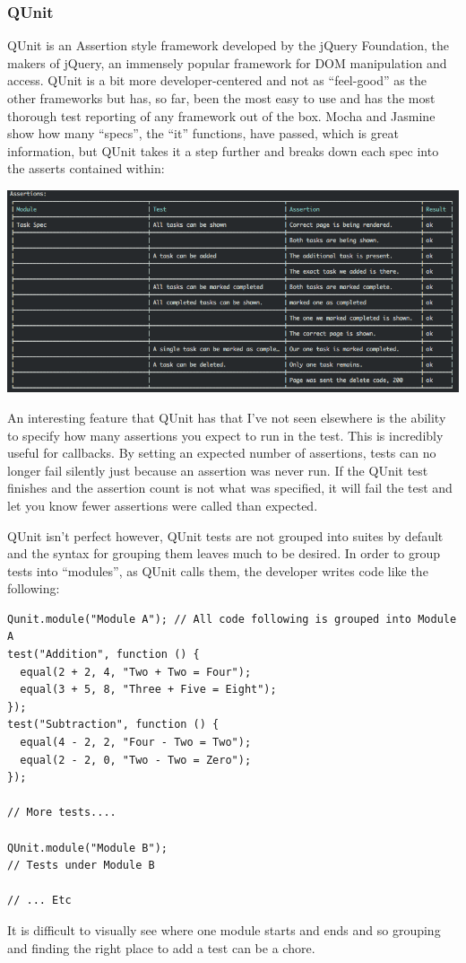 \documentclass[11pt]{article}
\newenvironment{Figure}
  {\par\medskip\noindent\minipage{\linewidth}}
  {\endminipage\par\medskip}
\begin{document}
\subsubsection{QUnit \cite{QUnit}}
QUnit is an Assertion style framework developed by the jQuery Foundation, the makers of jQuery, an immensely popular framework for DOM manipulation and access. QUnit is a bit more developer-centered and not as ``feel-good'' as the other frameworks but has, so far, been the most easy to use and has the most thorough test reporting of any framework out of the box. Mocha and Jasmine show how many ``specs'', the ``it'' functions, have passed, which is great information, but QUnit takes it a step further and breaks down each spec into the asserts contained within:
\begin{Figure}
  \centering
  \includegraphics[width=\linewidth]{qunitrunner.png} 
\end{Figure}
An interesting feature that QUnit has that I've not seen elsewhere is the ability to specify how many assertions you expect to run in the test. This is incredibly useful for callbacks. By setting an expected number of assertions, tests can no longer fail silently just because an assertion was never run. If the QUnit test finishes and the assertion count is not what was specified, it will fail the test and let you know fewer assertions were called than expected.

QUnit isn't perfect however, QUnit tests are not grouped into suites by default and the syntax for grouping them leaves much to be desired. In order to group tests into ``modules'', as QUnit calls them, the developer writes code like the following:
\begin{lstlisting}
Qunit.module("Module A"); // All code following is grouped into Module A
test("Addition", function () {
  equal(2 + 2, 4, "Two + Two = Four");
  equal(3 + 5, 8, "Three + Five = Eight");
});
test("Subtraction", function () {
  equal(4 - 2, 2, "Four - Two = Two");
  equal(2 - 2, 0, "Two - Two = Zero");
});

// More tests....

QUnit.module("Module B");
// Tests under Module B

// ... Etc
\end{lstlisting}
It is difficult to visually see where one module starts and ends and so grouping and finding the right place to add a test can be a chore.
\end{document}
